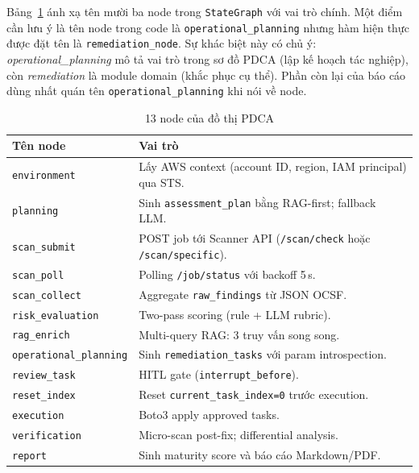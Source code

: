 Bảng~\ref{tab:node_impl_mapping_v2} ánh xạ tên mười ba node trong \texttt{StateGraph} với vai trò chính. Một điểm cần lưu ý là tên node trong code là \texttt{operational\_planning} nhưng hàm hiện thực được đặt tên là \texttt{remediation\_node}. Sự khác biệt này có chủ ý: \emph{operational\_planning} mô tả vai trò trong sơ đồ PDCA (lập kế hoạch tác nghiệp), còn \emph{remediation} là module domain (khắc phục cụ thể). Phần còn lại của báo cáo dùng nhất quán tên \texttt{operational\_planning} khi nói về node.

\begin{table}[!htb]
  \centering
  \caption{13 node của đồ thị PDCA}
  \label{tab:node_impl_mapping_v2}
  \renewcommand{\arraystretch}{1.15}
  \begin{tabular}{|l|p{9.0cm}|}
    \hline
    \textbf{Tên node} & \textbf{Vai trò} \\ \hline
    \texttt{environment}           & Lấy AWS context (account ID, region, IAM principal) qua STS. \\ \hline
    \texttt{planning}              & Sinh \texttt{assessment\_plan} bằng RAG-first; fallback LLM. \\ \hline
    \texttt{scan\_submit}          & POST job tới Scanner API (\texttt{/scan/check} hoặc \texttt{/scan/specific}). \\ \hline
    \texttt{scan\_poll}            & Polling \texttt{/job/status} với backoff 5\,s. \\ \hline
    \texttt{scan\_collect}         & Aggregate \texttt{raw\_findings} từ JSON OCSF. \\ \hline
    \texttt{risk\_evaluation}      & Two-pass scoring (rule + LLM rubric). \\ \hline
    \texttt{rag\_enrich}           & Multi-query RAG: 3 truy vấn song song. \\ \hline
    \texttt{operational\_planning} & Sinh \texttt{remediation\_tasks} với param introspection. \\ \hline
    \texttt{review\_task}          & HITL gate (\texttt{interrupt\_before}). \\ \hline
    \texttt{reset\_index}          & Reset \texttt{current\_task\_index=0} trước execution. \\ \hline
    \texttt{execution}             & Boto3 apply approved tasks. \\ \hline
    \texttt{verification}          & Micro-scan post-fix; differential analysis. \\ \hline
    \texttt{report}                & Sinh maturity score và báo cáo Markdown/PDF. \\ \hline
  \end{tabular}
\end{table}

